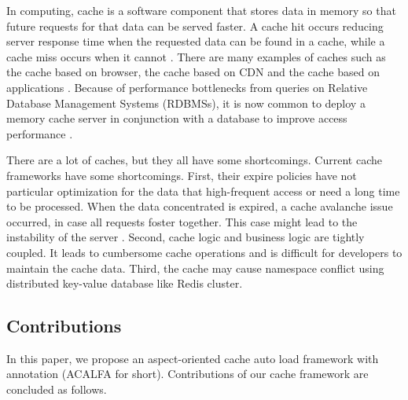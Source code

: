 \documentclass{singlecol-new}
\theoremstyle{TH}{
\newtheorem{lemma}{Lemma}
\newtheorem{theorem}[lemma]{Theorem}
\newtheorem{corrolary}[lemma]{Corrolary}
\newtheorem{conjecture}[lemma]{Conjecture}
\newtheorem{proposition}[lemma]{Proposition}
\newtheorem{claim}[lemma]{Claim}
\newtheorem{stheorem}[lemma]{Wrong Theorem}
}
\theoremstyle{THrm}{
\newtheorem{definition}{Definition}[section]
\newtheorem{question}{Question}[section]
\newtheorem{remark}{Remark}
\newtheorem{scheme}{Scheme}
}
\theoremstyle{THhit}{
\newtheorem{case}{Case}[section]
}
\begin{document}
In computing, cache is a software component that stores data in memory so that future requests for that data can be served faster. A cache hit occurs reducing server response time when the requested data can be found in a cache, while a cache miss occurs when it cannot \cite{ma2017segment}. There are many examples of caches such as the cache based on browser, the cache based on CDN \cite{manjhi2005finding} and the cache based on applications \cite{wu2011characterization}. Because of performance bottlenecks from queries on Relative Database Management Systems (RDBMSs), it is now common to deploy a memory cache server in conjunction with a database to improve access performance \cite{ma2017column}.

There are a lot of caches, but they all have some shortcomings. Current cache frameworks have some shortcomings. First, their expire policies have not particular optimization for the data that high-frequent access or need a long time to be processed. When the data concentrated is expired, a cache avalanche issue occurred, in case all requests foster together. This case might lead to the instability of the server \cite{ma2017column}. Second, cache logic and business logic are tightly coupled. It leads to cumbersome cache operations and is difficult for developers to maintain the cache data. Third, the cache may cause namespace conflict using distributed key-value database like Redis cluster.

\subsection{Contributions}
In this paper, we propose an aspect-oriented cache auto load framework with annotation (ACALFA for short). Contributions of our cache framework are concluded as follows.
\end{document}

